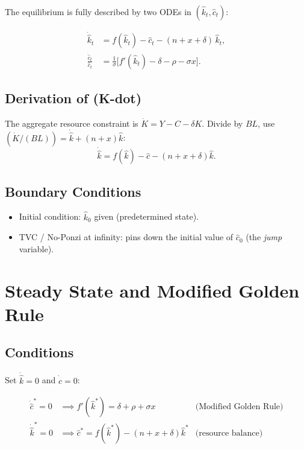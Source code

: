 \documentclass[a4paper,11pt]{article}
\newcommand{\khat}{\hat{k}}
\newcommand{\chat}{\hat{c}}
\begin{document}
The equilibrium is fully described by two ODEs in $(\khat_t, \chat_t)$:

\begin{keyformulabox}[title={Two-ODE System}]
\begin{align*}
  \dot{\khat}_t &= f(\khat_t) - \chat_t - (n + x + \delta)\,\khat_t,
  \tag{K-dot} \\[6pt]
  \frac{\dot{\chat}_t}{\chat_t} &= \frac{1}{\sigma}\bigl[f'(\khat_t) - \delta - \rho - \sigma x\bigr].
  \tag{C-dot}
\end{align*}
\end{keyformulabox}

\subsection*{Derivation of (K-dot)}
The aggregate resource constraint is $\dot{K} = Y - C - \delta K$.
Divide by $B L$, use $(\dot{K}/(BL)) = \dot{\khat} + (n+x)\khat$:
\[
  \dot{\khat} = f(\khat) - \chat - (n+x+\delta)\khat.
\]

\subsection*{Boundary Conditions}
\begin{itemize}[leftmargin=*]
  \item Initial condition: $\khat_0$ given (predetermined state).
  \item TVC / No-Ponzi at infinity: pins down the initial value of $\chat_0$ (the \emph{jump} variable).
\end{itemize}

\section{Steady State and Modified Golden Rule}

\subsection*{Conditions}
Set $\dot{\khat} = 0$ and $\dot{\chat} = 0$:

\begin{resultbox}[title={Steady State Equations}]
\begin{align*}
  \dot{\chat}^* = 0 &\implies \boxed{f'(\khat^*) = \delta + \rho + \sigma x}
  & \text{(Modified Golden Rule)} \tag{MGR} \\[4pt]
  \dot{\khat}^* = 0 &\implies \chat^* = f(\khat^*) - (n+x+\delta)\khat^*
  & \text{(resource balance)}
\end{align*}
\end{resultbox}
\end{document}

